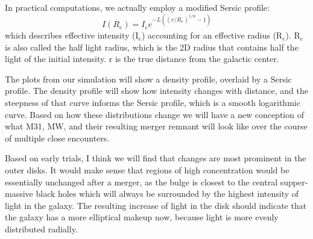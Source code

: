 \documentclass[linenumbers,trackchanges,twocolumn]{aastex7}
\begin{document}
In practical computations, we actually employ a modified Sersic profile: 
\begin{equation} \label{eq:2}
    I(R_e) = I_ee^{-L((r/R_e)^{1/n}-1)}
\end{equation}
which describes effective intensity (I$_e$) accounting for an effective radius (R$_e$). R$_e$ is also called the half light radius, which is the 2D radius that contains half the light of the initial intensity. r is the true distance from the galactic center.

The plots from our simulation will show a density profile, overlaid by a Sersic profile. The density profile will show how intensity changes with distance, and the steepness of that curve informs the Sersic profile, which is a smooth logarithmic curve. Based on how these distributions change we will have a new conception of what M31, MW, and their resulting merger remnant will look like over the course of multiple close encounters. 

Based on early trials, I think we will find that changes are most prominent in the outer disks. It would make sense that regions of high concentration would be essentially unchanged after a merger, as the bulge is closest to the central supper-massive black holes which will always be surrounded by the highest intensity of light in the galaxy. The resulting increase of light in the disk should indicate that the galaxy has a more elliptical makeup now, because light is more evenly distributed radially. 


{}

\end{document}
